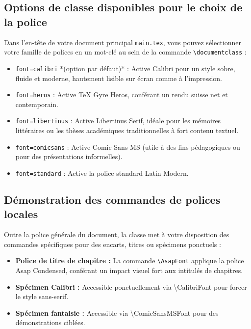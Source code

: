 \subsection{Options de classe disponibles pour le choix de la police}
\label{subsec:options_polices}

Dans l'en-tête de votre document principal \texttt{main.tex}, vous pouvez sélectionner votre famille de polices en un mot-clé au sein de la commande \texttt{\textbackslash documentclass} :

\begin{itemize}
  \item \texttt{font=calibri} *(option par défaut)* : Active \textsf{Calibri} pour un style sobre, fluide et moderne, hautement lisible sur écran comme à l'impression.
  \item \texttt{font=heros} : Active \textsf{TeX Gyre Heros}, conférant un rendu suisse net et contemporain.
  \item \texttt{font=libertinus} : Active \textsf{Libertinus Serif}, idéale pour les mémoires littéraires ou les thèses académiques traditionnelles à fort contenu textuel.
  \item \texttt{font=comicsans} : Active \textsf{Comic Sans MS} (utile à des fins pédagogiques ou pour des présentations informelles).
  \item \texttt{font=standard} : Active la police standard \textsf{Latin Modern}.
\end{itemize}

\subsection{Démonstration des commandes de polices locales}
\label{subsec:commandes_polices_locales}

Outre la police générale du document, la classe met à votre disposition des commandes spécifiques pour des encarts, titres ou spécimens ponctuels :

\begin{itemize}
  \item \textbf{Police de titre de chapitre :} La commande \texttt{\textbackslash AsapFont} applique la police {\AsapFont Asap Condensed}, conférant un impact visuel fort aux intitulés de chapitres.
  \item \textbf{Spécimen Calibri :} Accessible ponctuellement via {\CalibriFont \textbackslash CalibriFont pour forcer le style sans-serif}.
  \item \textbf{Spécimen fantaisie :} Accessible via {\ComicSansMSFont \textbackslash ComicSansMSFont pour des démonstrations ciblées}.
\end{itemize}


